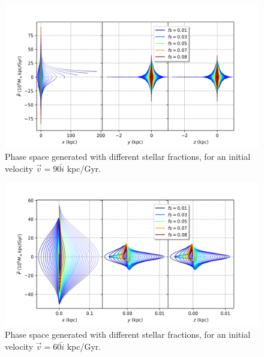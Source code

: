 	\begin{figure}[h]
		\centering
		\includegraphics[width = 0.9\linewidth]{"../Files/Week 9/PhaseSpace_escape"}
		\caption{Phase space generated with different stellar fractions, for an initial velocity $\vec{v} = 90\hat{i}$ kpc/Gyr.}
		\label{fig: escapePhaseSpace}
	\end{figure}
	\begin{figure}[h]
		\centering
		\includegraphics[width = 0.9\linewidth]{"../Files/Week 9/PhaseSpace_in"}
		\caption{Phase space generated with different stellar fractions, for an initial velocity $\vec{v} = 60\hat{i}$ kpc/Gyr.}
		\label{fig: escapeInner}
	\end{figure}

